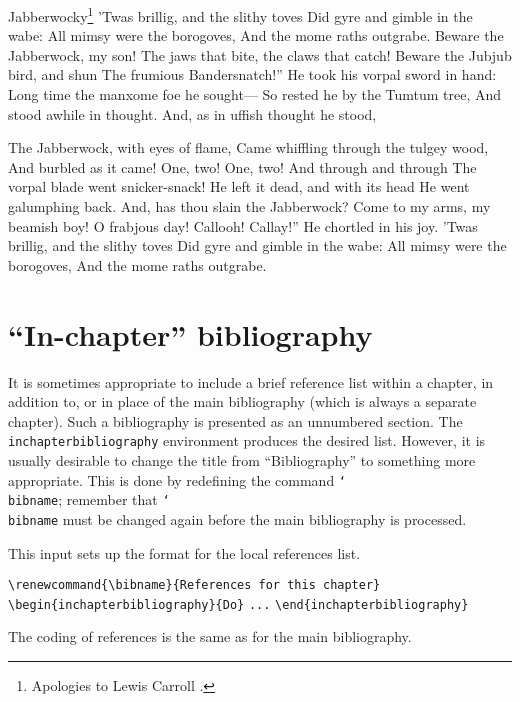 \documentclass[multixcb]{amstext-l}
\theoremstyle{plain}
\theoremstyle{definition}
\newcommand{\cs}[1]{\texttt{\char`\\#1}}
\newcommand{\env}[1]{\texttt{#1}}
\newenvironment{exm}{%
  \par
  \begingroup
    \parindent0pt
    \leftskip2\normalparindent
    \obeylines
}{%
    \par
  \endgroup
}
\begin{document}
\begin{inclusion}{Jabberwocky\footnote{Apologies to
  Lewis Carroll \cite{Do}.}}
\obeylines\parindent=0pt
'Twas brillig, and the slithy toves
  Did gyre and gimble in the wabe:
All mimsy were the borogoves,
  And the mome raths outgrabe.
\null
\leavevmode{}Beware the Jabberwock, my son!
  The jaws that bite, the claws that catch!
Beware the Jubjub bird, and shun
  The frumious Bandersnatch!''
\null
He took his vorpal sword in hand:
  Long time the manxome foe he sought---
So rested he by the Tumtum tree,
  And stood awhile in thought.
\null
And, as in uffish thought he stood,\par\nobreak
  The Jabberwock, with eyes of flame,
Came whiffling through the tulgey wood,
  And burbled as it came!
\null
One, two! One, two! And through and through
  The vorpal blade went snicker-snack!
He left it dead, and with its head
  He went galumphing back.
\null
\leavevmode{}And, has thou slain the Jabberwock?
  Come to my arms, my beamish boy!
O frabjous day! Callooh! Callay!''
  He chortled in his joy.
\null
'Twas brillig, and the slithy toves
  Did gyre and gimble in the wabe:
All mimsy were the borogoves,
  And the mome raths outgrabe.
\end{inclusion}

\section{``In-chapter'' bibliography}

It is sometimes appropriate to include a brief reference list within
a chapter, in addition to, or in place of the main bibliography (which
is always a separate chapter).  Such a bibliography is presented as
an unnumbered section.  The \env{inchapterbibliography} environment
produces the desired list.  However, it is usually desirable to change
the title from ``Bibliography'' to something more appropriate.  This
is done by redefining the command \cs{bibname}; remember that
\cs{bibname} must be changed again before the main bibliography
is processed.

This input sets up the format for the local references list.
\begin{exm}
\verb+\renewcommand{\bibname}{References for this chapter}+
\verb+\begin{inchapterbibliography}{Do}+
\verb+...+
\verb+\end{inchapterbibliography}+
\end{exm}
\noindent
The coding of references is the same as for the main bibliography.
\end{document}
